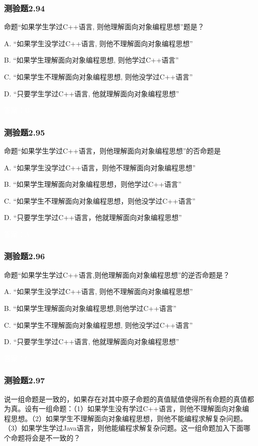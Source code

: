 \documentclass[UTF8, heading=true]{ctexart}
\begin{document}
\subsubsection{测验题2.94}

命题“如果学生学过C++语言, 则他理解面向对象编程思想”题是？

A. “如果学生没学过C++语言, 则他不理解面向对象编程思想”

B. “如果学生理解面向对象编程思想, 则他学过C++语言”

C. “如果学生不理解面向对象编程思想, 则他没学过C++语言”

D. “只要学生学过C++语言, 他就理解面向对象编程思想”

\textcolor{white}{答案：B}

\subsubsection{测验题2.95}

命题“如果学生学过C++语言，则他理解面向对象编程思想”的否命题是

A. 
“如果学生没学过C++语言，则他不理解面向对象编程思想”

B. 
“如果学生理解面向对象编程思想，则他学过C++语言”

C. 
“如果学生不理解面向对象编程思想，则他没学过C++语言”

D.  
“只要学生学过C++语言，他就理解面向对象编程思想”

\textcolor{white}{答案：A}

\subsubsection{测验题2.96}

命题“如果学生学过C++语言,则他理解面向对象编程思想”的逆否命题是？

A. “如果学生没学过C++语言, 则他不理解面向对象编程思想”

B. “如果学生理解面向对象编程思想,则他学过C++语言”

C. “如果学生不理解面向对象编程思想, 则他没学过C++语言”

D. “只要学生学过C++语言, 他就理解面向对象编程思想”

\textcolor{white}{答案：C}

\subsubsection{测验题2.97}

说一组命题是一致的，如果存在对其中原子命题的真值赋值使得所有命题的真值都为真。设有一组命题：（1）如果学生没有学过C++语言，则他不理解面向对象编程思想。（2）如果学生不理解面向对象编程思想，则他不能编程求解复杂问题。（3）如果学生学过Java语言，则他能编程求解复杂问题。这一组命题加入下面哪个命题将会是不一致的？
\end{document}
